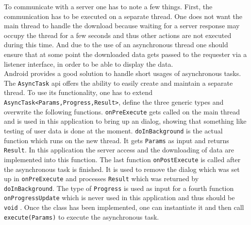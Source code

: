 To  communicate with a server one has to note a few things. First, the communication has to be executed on a separate thread. One does not want the main thread to handle the download because waiting for a server response may occupy the thread for a few seconds and thus other actions are not executed during this time. And due to the use of an asynchronous thread one should ensure that at some point the downloaded data gets passed to the requester via a listener interface, in order to be able to display the data.\\
Android provides a good solution to handle short usages of asynchronous tasks. The \lstinline$AsyncTask$ api offers the ability to easily create and maintain a separate thread. To use its functionality, one has to extend \lstinline$AsyncTask<Params,Progress,Result>$, define the three generic types and overwrite the following functions. \lstinline$onPreExecute$ gets called on the main thread and is used in this application to bring up an dialog, showing that something like testing of user data is done at the moment.  \lstinline$doInBackground$ is the actual function which runs on the new thread. It gets \lstinline{Params} as input and returns \lstinline{Result}. In this application the server access and the downloading of data are implemented into this function. The last function \lstinline$onPostExecute$ is called after the asynchronous task is finished. It is used to remove the dialog which was set up in \lstinline$onPreExecute$ and processes \lstinline{Result} which was returned by \lstinline$doInBackground$. The type of \lstinline$Progress$ is used as input for a fourth function \lstinline$onProgressUpdate$ which is never used in this application and thus should be \lstinline&void& \cite{asynctask}. Once the class has been implemented, one can instantiate it and then call \lstinline$execute(Params)$ to execute the asynchronous task.

